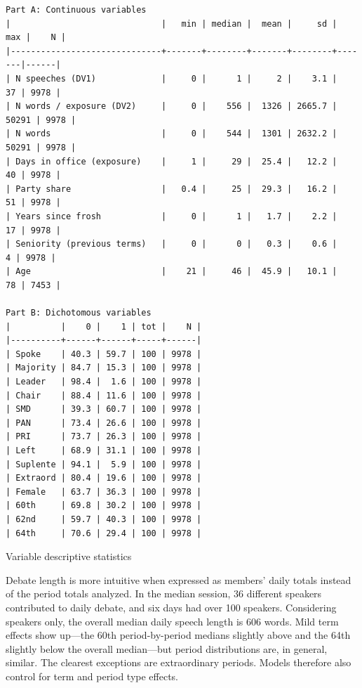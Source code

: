 \documentclass[letter,12pt]{article}
\begin{document}
\begin{table}
  \begin{scriptsize}
    \begin{verbatim}
Part A: Continuous variables
|                              |   min | median |  mean |     sd |   max |    N |
|------------------------------+-------+--------+-------+--------+-------|------|
| N speeches (DV1)             |     0 |      1 |     2 |    3.1 |    37 | 9978 |
| N words / exposure (DV2)     |     0 |    556 |  1326 | 2665.7 | 50291 | 9978 |
| N words                      |     0 |    544 |  1301 | 2632.2 | 50291 | 9978 |
| Days in office (exposure)    |     1 |     29 |  25.4 |   12.2 |    40 | 9978 |
| Party share                  |   0.4 |     25 |  29.3 |   16.2 |    51 | 9978 |
| Years since frosh            |     0 |      1 |   1.7 |    2.2 |    17 | 9978 |
| Seniority (previous terms)   |     0 |      0 |   0.3 |    0.6 |     4 | 9978 |
| Age                          |    21 |     46 |  45.9 |   10.1 |    78 | 7453 |

Part B: Dichotomous variables
|          |    0 |    1 | tot |    N |
|----------+------+------+-----+------|
| Spoke    | 40.3 | 59.7 | 100 | 9978 |
| Majority | 84.7 | 15.3 | 100 | 9978 |
| Leader   | 98.4 |  1.6 | 100 | 9978 |
| Chair    | 88.4 | 11.6 | 100 | 9978 |
| SMD      | 39.3 | 60.7 | 100 | 9978 |
| PAN      | 73.4 | 26.6 | 100 | 9978 |
| PRI      | 73.7 | 26.3 | 100 | 9978 |
| Left     | 68.9 | 31.1 | 100 | 9978 |
| Suplente | 94.1 |  5.9 | 100 | 9978 |
| Extraord | 80.4 | 19.6 | 100 | 9978 |
| Female   | 63.7 | 36.3 | 100 | 9978 |
| 60th     | 69.8 | 30.2 | 100 | 9978 |
| 62nd     | 59.7 | 40.3 | 100 | 9978 |
| 64th     | 70.6 | 29.4 | 100 | 9978 |
    \end{verbatim}
  \end{scriptsize}
\caption{Variable descriptive statistics}\label{T:descriptives}
\end{table}

Debate length is more intuitive when expressed as members' daily totals instead of the period totals analyzed. In the median session, 36 different speakers contributed to daily debate, and six days had over 100 speakers. Considering speakers only, the overall median daily speech length is 606 words. Mild term effects show up---the 60th period-by-period medians slightly above and the 64th slightly below the overall median---but period distributions are, in general, similar. The clearest exceptions are extraordinary periods. Models therefore also control for term and period type effects.
\end{document}
